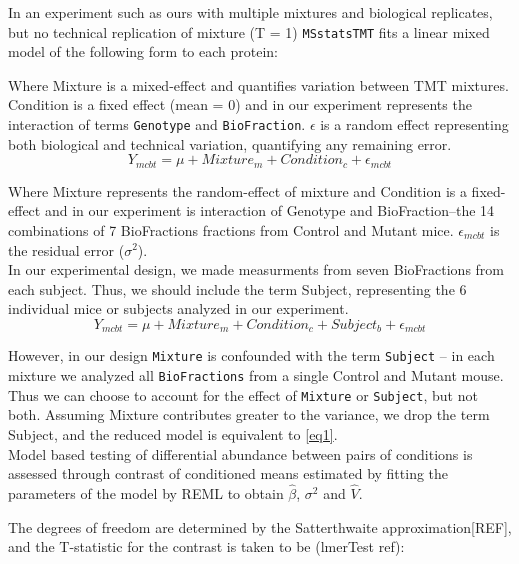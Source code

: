 \documentclass[11pt]{elife}\usepackage[]{graphicx}\usepackage[]{color}
\begin{document}
\begin{fullwidth}
In an experiment such as ours with multiple mixtures and biological replicates, 
but no technical replication of mixture (T = 1) \texttt{MSstatsTMT} fits a
linear mixed model of the following form to each protein:

Where Mixture is a mixed-effect and quantifies variation between TMT mixtures.
Condition is a fixed effect (mean = 0) and in our experiment represents the
interaction of terms \texttt{Genotype} and \texttt{BioFraction}. $\epsilon$ 
is a random effect representing both biological and technical variation, 
quantifying any remaining error. \\

\begin{equation} \label{eq1}
	Y_{mcbt} = \mu + Mixture_m + Condition_c + \epsilon_{mcbt}
\end{equation}

Where Mixture represents the random-effect of mixture and 
Condition is a fixed-effect and in our experiment is interaction of 
Genotype and BioFraction--the 14 combinations of 7 BioFractions fractions from 
Control and Mutant mice. $\epsilon_{mcbt}$ is the residual error ($\sigma^2$).\\

In our experimental design, we made measurments from seven BioFractions 
from each subject. Thus, we should include the term 
Subject, representing the 6 individual mice or subjects analyzed in our 
experiment. \\

\begin{equation} \label{eq2}
	Y_{mcbt} = \mu + Mixture_m + Condition_c + Subject_b + \epsilon_{mcbt}
\end{equation}

However, in our design \texttt{Mixture} is confounded with the
term \texttt{Subject} -- in each mixture we analyzed all \texttt{BioFractions} 
from a single Control and Mutant mouse. Thus we can choose to account for the 
effect of \texttt{Mixture} or \texttt{Subject}, but not both. 
Assuming Mixture contributes greater to the variance, we drop the term Subject,
and the reduced model is equivalent  to \ref{eq1}. \\

Model based testing of differential abundance between pairs of conditions
is assessed through contrast of conditioned means estimated by fitting the
parameters of the model by REML to obtain $\hat{\beta}$, $\sigma^2$ and
$\hat{V}$.

The degrees of freedom are determined by the Satterthwaite approximation[REF],
and the T-statistic for the contrast is taken to be (lmerTest ref): \\


\end{fullwidth}
\end{document}
